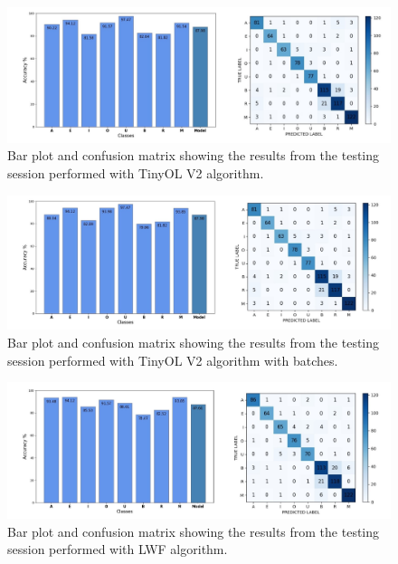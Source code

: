 \documentclass[12pt]{report}
\begin{document}
\begin{figure}[h!]
    \centering
    \includegraphics[width=140mm]{Figures/Chapter5/STM_barPlot_OL_V2.jpg} 
    \caption{Bar plot and confusion matrix showing the results from the testing session performed with TinyOL V2 algorithm.}
    \label{fig:letter_res_OL_v2}    
\end{figure}

\begin{figure}[h!]
    \centering
    \includegraphics[width=140mm]{Figures/Chapter5/STM_barPlot_OL_V2_batch.jpg} 
    \caption{Bar plot and confusion matrix showing the results from the testing session performed with TinyOL V2 algorithm with batches.}
    \label{fig:letter_res_OL_v2_batch}    
\end{figure}

\begin{figure}[h!]
    \centering
    \includegraphics[width=140mm]{Figures/Chapter5/STM_barPlot_LWF.jpg} 
    \caption{Bar plot and confusion matrix showing the results from the testing session performed with LWF algorithm.}
    \label{fig:letter_res_LWF}    
\end{figure}
\end{document}
